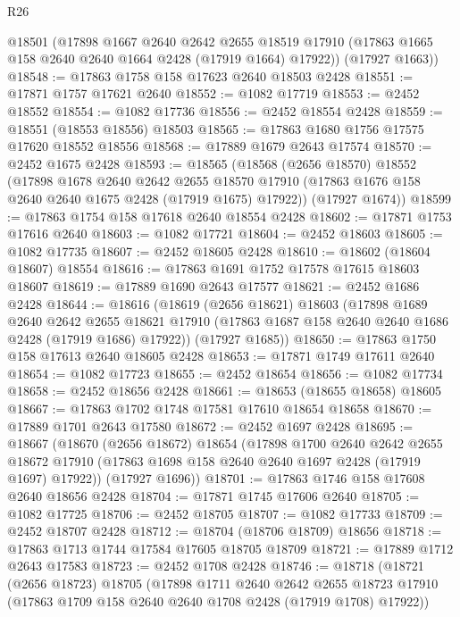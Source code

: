 \begin{lexlean}{R26}
\begin{coremodule}
      @18501
      (@17898
        @1667
        @2640
        @2642
        @2655
        @18519
        @17910
        (@17863 @1665 @158 @2640 @2640 @1664 @2428 (@17919 @1664) @17922))
      (@17927 @1663))
@18548 := @17863 @1758 @158 @17623 @2640 @18503 @2428
@18551 := @17871 @1757 @17621 @2640
@18552 := @1082 @17719
@18553 := @2452 @18552
@18554 := @1082 @17736
@18556 := @2452 @18554 @2428
@18559 := @18551 (@18553 @18556) @18503
@18565 := @17863 @1680 @1756 @17575 @17620 @18552 @18556
@18568 := @17889 @1679 @2643 @17574
@18570 := @2452 @1675 @2428
@18593 := @18565
    (@18568
      (@2656 @18570)
      @18552
      (@17898
        @1678
        @2640
        @2642
        @2655
        @18570
        @17910
        (@17863 @1676 @158 @2640 @2640 @1675 @2428 (@17919 @1675) @17922))
      (@17927 @1674))
@18599 := @17863 @1754 @158 @17618 @2640 @18554 @2428
@18602 := @17871 @1753 @17616 @2640
@18603 := @1082 @17721
@18604 := @2452 @18603
@18605 := @1082 @17735
@18607 := @2452 @18605 @2428
@18610 := @18602 (@18604 @18607) @18554
@18616 := @17863 @1691 @1752 @17578 @17615 @18603 @18607
@18619 := @17889 @1690 @2643 @17577
@18621 := @2452 @1686 @2428
@18644 := @18616
    (@18619
      (@2656 @18621)
      @18603
      (@17898
        @1689
        @2640
        @2642
        @2655
        @18621
        @17910
        (@17863 @1687 @158 @2640 @2640 @1686 @2428 (@17919 @1686) @17922))
      (@17927 @1685))
@18650 := @17863 @1750 @158 @17613 @2640 @18605 @2428
@18653 := @17871 @1749 @17611 @2640
@18654 := @1082 @17723
@18655 := @2452 @18654
@18656 := @1082 @17734
@18658 := @2452 @18656 @2428
@18661 := @18653 (@18655 @18658) @18605
@18667 := @17863 @1702 @1748 @17581 @17610 @18654 @18658
@18670 := @17889 @1701 @2643 @17580
@18672 := @2452 @1697 @2428
@18695 := @18667
    (@18670
      (@2656 @18672)
      @18654
      (@17898
        @1700
        @2640
        @2642
        @2655
        @18672
        @17910
        (@17863 @1698 @158 @2640 @2640 @1697 @2428 (@17919 @1697) @17922))
      (@17927 @1696))
@18701 := @17863 @1746 @158 @17608 @2640 @18656 @2428
@18704 := @17871 @1745 @17606 @2640
@18705 := @1082 @17725
@18706 := @2452 @18705
@18707 := @1082 @17733
@18709 := @2452 @18707 @2428
@18712 := @18704 (@18706 @18709) @18656
@18718 := @17863 @1713 @1744 @17584 @17605 @18705 @18709
@18721 := @17889 @1712 @2643 @17583
@18723 := @2452 @1708 @2428
@18746 := @18718
    (@18721
      (@2656 @18723)
      @18705
      (@17898
        @1711
        @2640
        @2642
        @2655
        @18723
        @17910
        (@17863 @1709 @158 @2640 @2640 @1708 @2428 (@17919 @1708) @17922))

\end{coremodule}
\end{lexlean}
